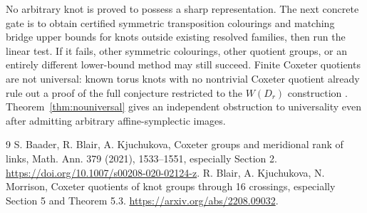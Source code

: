 \documentclass[11pt]{article}
\begin{document}
No arbitrary knot is proved to possess a sharp representation. The next
concrete gate is to obtain certified symmetric transposition colourings
and matching bridge upper bounds for knots outside existing resolved
families, then run the linear test. If it fails, other symmetric
colourings, other quotient groups, or an entirely different lower-bound
method may still succeed. Finite Coxeter quotients are not universal:
known torus knots with no nontrivial Coxeter quotient already rule out
a proof of the full conjecture restricted to the $W(D_r)$ construction
\cite{bkm}. Theorem~\ref{thm:nouniversal} gives an independent obstruction
to universality even after admitting arbitrary affine-symplectic images.

\begin{thebibliography}{9}
 S. Baader, R. Blair, A. Kjuchukova,
Coxeter groups and meridional rank of links,
Math. Ann. 379 (2021), 1533--1551, especially Section 2.
\url{https://doi.org/10.1007/s00208-020-02124-z}.
 R. Blair, A. Kjuchukova, N. Morrison,
Coxeter quotients of knot groups through 16 crossings,
especially Section 5 and Theorem 5.3.
\url{https://arxiv.org/abs/2208.09032}.
\end{thebibliography}
\end{document}
